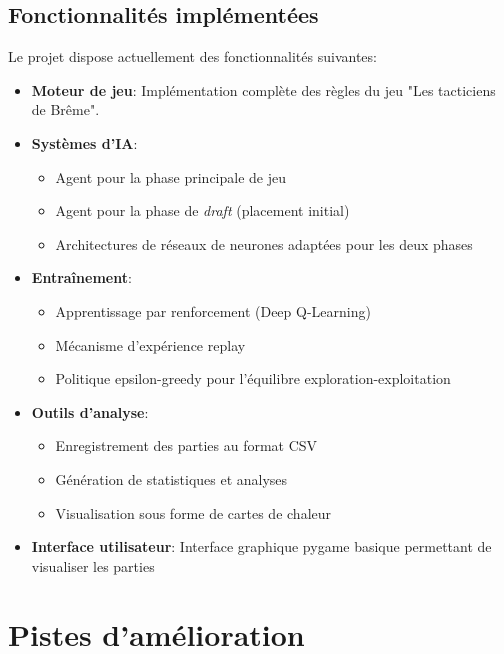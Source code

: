 \documentclass[]{article}
\begin{document}
\subsection{Fonctionnalités implémentées}

Le projet dispose actuellement des fonctionnalités suivantes:

\begin{itemize}
  \item \textbf{Moteur de jeu}: Implémentation complète des règles du jeu "Les tacticiens de Brême".

  \item \textbf{Systèmes d'IA}:
    \begin{itemize}
      \item Agent pour la phase principale de jeu
      \item Agent pour la phase de \emph{draft} (placement initial)
      \item Architectures de réseaux de neurones adaptées pour les deux phases
    \end{itemize}

  \item \textbf{Entraînement}:
    \begin{itemize}
      \item Apprentissage par renforcement (Deep Q-Learning)
      \item Mécanisme d'expérience replay
      \item Politique epsilon-greedy pour l'équilibre exploration-exploitation
    \end{itemize}

  \item \textbf{Outils d'analyse}:
    \begin{itemize}
      \item Enregistrement des parties au format CSV
      \item Génération de statistiques et analyses
      \item Visualisation sous forme de cartes de chaleur
    \end{itemize}

  \item \textbf{Interface utilisateur}: Interface graphique pygame basique permettant de visualiser les parties
\end{itemize}

\section{Pistes d'amélioration}
\end{document}
